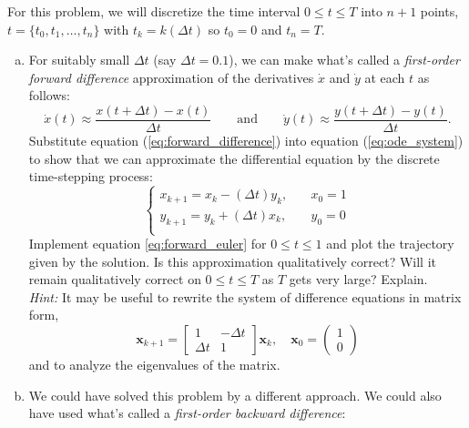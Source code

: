\documentclass[11pt,oneside]{article}
\theoremstyle{definition}
\theoremstyle{definition}
\theoremstyle{remark}
\numberwithin{equation}{section}
\begin{document}
For this problem, we will discretize the time interval $0 \leq t \leq T$ into $n+1$ points, $ t = \{t_0, t_1, \dots, t_n\}$ with $t_k = k (\Delta t)$ so $t_0=0$ and $t_n = T$. 
\begin{enumerate}[(a)]
    \item For suitably small $\Delta t$ (say $\Delta t = 0.1$), we can make what's called a \textit{first-order forward difference} approximation of the derivatives $\dot{x}$ and $\dot{y}$ at each $t$ as follows:
    \begin{equation} 
    \label{eq:forward_difference}
    \dot{x}(t) \approx \frac{x(t + \Delta t) - x(t)}{\Delta t} \qquad \text{and} \qquad \dot{y}(t) \approx \frac{y(t + \Delta t) - y(t)}{\Delta t}.
    \end{equation}
     Substitute equation (\ref{eq:forward_difference}) into equation (\ref{eq:ode_system}) to show that we can approximate the differential equation by the discrete time-stepping process:
    \begin{equation}
    \label{eq:forward_euler}
    \begin{cases} x_{k+1} = x_k - (\Delta t) y_k, & \quad x_0 = 1\\  y_{k+1} = y_k + (\Delta t) x_k, & \quad y_0 = 0\\  \end{cases}
    \end{equation}
    Implement equation \ref{eq:forward_euler} for $0 \leq t \leq 1$ and plot the trajectory given by the solution. Is this approximation qualitatively correct? Will it remain qualitatively correct on $0 \leq t \leq T$ as $T$ gets very large? Explain.\\
    \textit{Hint:} It may be useful to rewrite the system of difference equations in matrix form,
    \begin{equation*}
    \bm{x}_{k+1} 
    = \begin{bmatrix} 1 & -\Delta t \\  \Delta t & 1\end{bmatrix} \bm{x}_k, \quad \bm{x}_0 = \begin{pmatrix} 1\\0 \end{pmatrix}
    \end{equation*}
    and to analyze the eigenvalues of the matrix.
    \item We could have solved this problem by a different approach. We could also have used what's called a \textit{first-order backward difference}:

\end{enumerate}
\end{document}
